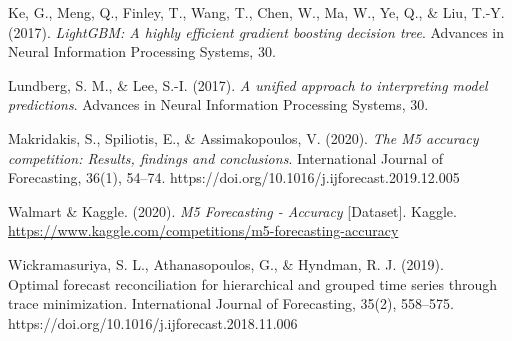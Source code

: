 \documentclass[IB,BIB]{TFUOC}%
\begin{document}
Ke, G., Meng, Q., Finley, T., Wang, T., Chen, W., Ma, W., Ye, Q., \&
Liu, T.-Y. (2017). \emph{LightGBM: A highly efficient gradient boosting
decision tree}. Advances in Neural Information Processing Systems, 30.

Lundberg, S. M., \& Lee, S.-I. (2017). \emph{A unified approach to
interpreting model predictions}. Advances in Neural Information
Processing Systems, 30.

Makridakis, S., Spiliotis, E., \& Assimakopoulos, V. (2020). \emph{The
M5 accuracy competition: Results, findings and conclusions}.
International Journal of Forecasting, 36(1), 54--74.
https://doi.org/10.1016/j.ijforecast.2019.12.005

Walmart \& Kaggle. (2020). \emph{M5 Forecasting - Accuracy}
{[}Dataset{]}. Kaggle.
\url{https://www.kaggle.com/competitions/m5-forecasting-accuracy}

Wickramasuriya, S. L., Athanasopoulos, G., \& Hyndman, R. J. (2019).\\
Optimal forecast reconciliation for hierarchical and grouped time series
through trace minimization. International Journal of Forecasting, 35(2),
558--575. https://doi.org/10.1016/j.ijforecast.2018.11.006
\end{document}
